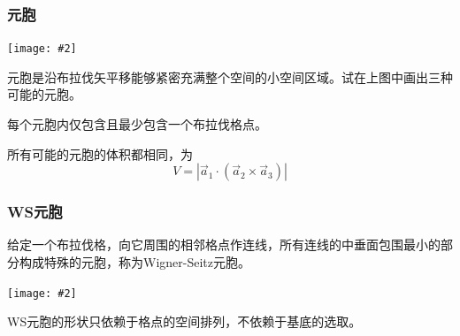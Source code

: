 \documentclass[CJK]{beamer}
\newcommand{\cpic}[2]{
\begin{center}
\texttt{[image: \#2]}
\end{center}
}
\begin{document}
\begin{frame}
\frametitle{\bch 元胞 \ech}
\bch

\cpic{0.45}{bases}
元胞是沿布拉伐矢平移能够紧密充满整个空间的小空间区域。试在上图中画出三种可能的元胞。
\par
每个元胞内仅包含且最少包含一个布拉伐格点。
\par
所有可能的元胞的体积都相同，为
$$
V = | \vec{a}_1 \cdot (\vec{a}_2 \times \vec{a}_3) |
$$

\ech
\end{frame}

\begin{frame}
\frametitle{\bch WS元胞 \ech}
\bch
给定一个布拉伐格，向它周围的相邻格点作连线，所有连线的中垂面包围最小的部分构成特殊的元胞，称为Wigner-Seitz元胞。
\cpic{0.6}{wscell}
WS元胞的形状只依赖于格点的空间排列，不依赖于基底的选取。
\ech
\end{frame}
\end{document}
